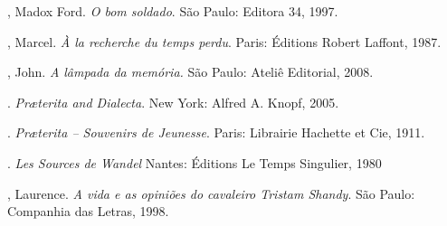 

 \begin{bibliohedra}
 , Madox Ford. \textit{O bom soldado}. São Paulo: Editora 34, 1997.

 , Marcel. \textit{À la recherche du temps perdu}. Paris: Éditions
 Robert Laffont, 1987.

 , John. \textit{A lâmpada da memória.} São Paulo: Ateliê Editorial, 2008.

 \titidem. \textit{Pr\ae terita and Dialecta}. New York: Alfred A. Knopf, 2005.

 \titidem. \textit{Pr\ae terita -- Souvenirs de Jeunesse}. Paris: Librairie Hachette et Cie, 1911.

 \titidem. \textit{Les Sources de Wandel} Nantes: Éditions Le Temps Singulier, 1980

 , Laurence. \textit{A vida e as opiniões do cavaleiro Tristam
 Shandy}. São Paulo: Companhia das Letras, 1998.
 \end{bibliohedra}
